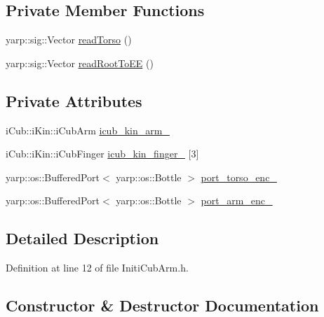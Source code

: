 \subsection*{Private Member Functions}
\begin{DoxyCompactItemize}
\item 
yarp\+::sig\+::\+Vector \hyperlink{classInitiCubArm_a9e4667c1412ed80a44307fad5e553598}{read\+Torso} ()
\item 
yarp\+::sig\+::\+Vector \hyperlink{classInitiCubArm_a1dc997322826f47da11f6c247f86e063}{read\+Root\+To\+EE} ()
\end{DoxyCompactItemize}
\subsection*{Private Attributes}
\begin{DoxyCompactItemize}
\item 
i\+Cub\+::i\+Kin\+::i\+Cub\+Arm \hyperlink{classInitiCubArm_ae91a23c5ca3112d9a18561844ac0413b}{icub\+\_\+kin\+\_\+arm\+\_\+}
\item 
i\+Cub\+::i\+Kin\+::i\+Cub\+Finger \hyperlink{classInitiCubArm_a6fb2f21dcfe50b9d28bb58bc90c93f36}{icub\+\_\+kin\+\_\+finger\+\_\+} \mbox{[}3\mbox{]}
\item 
yarp\+::os\+::\+Buffered\+Port$<$ yarp\+::os\+::\+Bottle $>$ \hyperlink{classInitiCubArm_a1587e14242e40ec6cefaecfd1d88aff4}{port\+\_\+torso\+\_\+enc\+\_\+}
\item 
yarp\+::os\+::\+Buffered\+Port$<$ yarp\+::os\+::\+Bottle $>$ \hyperlink{classInitiCubArm_a0eb264a33270c599c0621b2148096516}{port\+\_\+arm\+\_\+enc\+\_\+}
\end{DoxyCompactItemize}


\subsection{Detailed Description}


Definition at line 12 of file Initi\+Cub\+Arm.\+h.



\subsection{Constructor \& Destructor Documentation}
\mbox{\label{classInitiCubArm_aa59e8d0c6da59fcde27daec16e560cbf}} 
